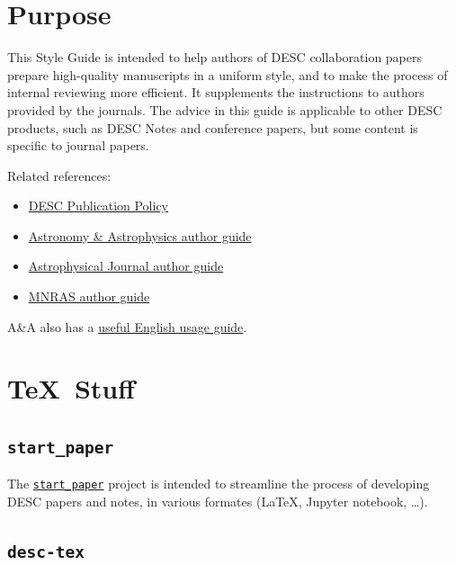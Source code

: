 \documentclass[letterpaper,11pt]{article}
\begin{document}
\section{Purpose}

This Style Guide is intended to help authors of DESC collaboration papers prepare
high-quality manuscripts in a uniform style, and to make the process of internal reviewing more efficient. It supplements the instructions
to authors provided by the journals.  The advice in this guide is applicable to other DESC products, such as DESC Notes and conference papers, but some content is specific to journal papers.

Related references:
\begin{itemize}
\item{\href{http://lsst-desc.org/sites/default/files/LSST_DESC_Publication_Policy_v6_15aug2016.pdf}{DESC Publication Policy}}

\item{\href{https://www.aanda.org/doc_journal/instructions/aadoc.pdf}{Astronomy \& Astrophysics author guide}}

\item{\href{http://journals.aas.org/authors/manuscript.html}{Astrophysical Journal author guide}}

\item \href{https://academic.oup.com/mnras/pages/General_Instructions}{MNRAS author guide}
\end{itemize}


A\&A also has a \href{http://www.aanda.org/doc_journal/instructions/aa_english_guide.pdf}{useful English usage guide}. 

\section{\TeX\ Stuff}

\subsection{\tt start\_paper}

The \href{https://github.com/LSSTDESC/start_paper}{\tt start\_paper} project is intended to streamline the process of developing DESC papers and notes, in various formates (La\TeX, Jupyter notebook, \ldots). 

\subsection{\tt desc-tex}
\end{document}
